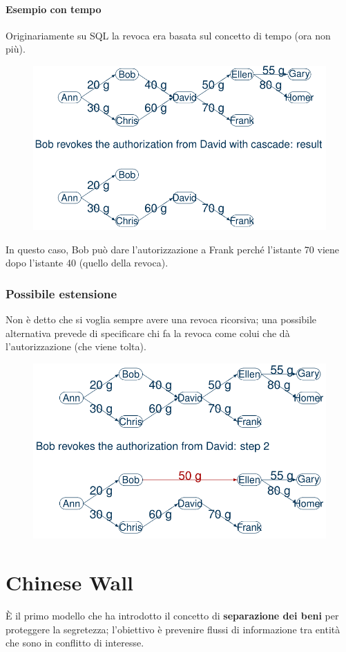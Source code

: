 \documentclass{report}
\begin{document}
\newpage
\subsubsection{Esempio con tempo}
Originariamente su SQL la revoca era basata sul concetto di tempo (ora 
non più).

\begin{figure}[H]
    \centering
    \includegraphics[width=0.8\linewidth]{images/rev-time.png}
\end{figure}

\noindent In questo caso, Bob può dare l'autorizzazione a Frank perché
l'istante 70 viene dopo l'istante 40 (quello della revoca).

\subsection{Possibile estensione}
Non è detto che si voglia sempre avere una revoca ricorsiva; una possibile alternativa 
prevede di specificare chi fa la revoca come colui che dà l'autorizzazione (che viene tolta).

\begin{figure}[H]
    \centering
    \includegraphics[width=0.8\linewidth]{images/rev-alt.png}
\end{figure}

\chapter{Chinese Wall}
È il primo modello che ha introdotto il concetto di \textbf{separazione dei beni} per proteggere 
la segretezza; 
l'obiettivo è prevenire flussi di informazione tra entità che sono in conflitto di interesse.
\end{document}
